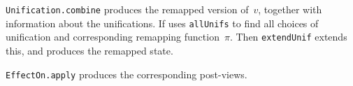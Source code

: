 


\begin{impNote}
\texttt{Unification.combine} produces the remapped version of~$v$, together
with information about the unifications.  If uses \texttt{allUnifs} to find
all choices of unification and corresponding remapping function~$\pi$.  Then
\texttt{extendUnif} extends this, and produces the remapped state.

\texttt{EffectOn.apply} produces the corresponding post-views.
\end{impNote}


